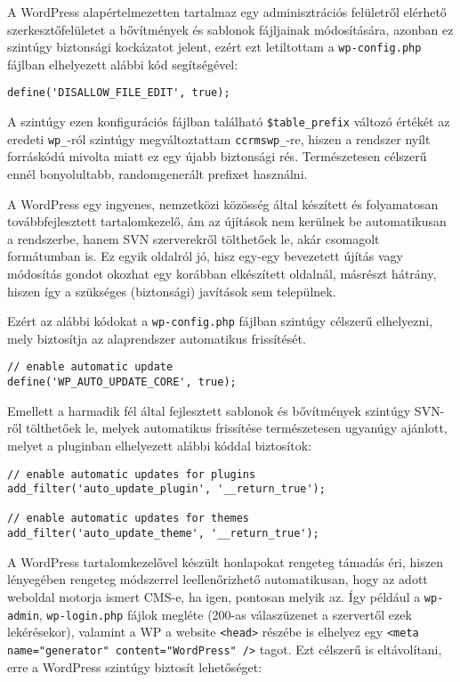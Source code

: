 A WordPress alapértelmezetten tartalmaz egy adminisztrációs felületről elérhető szerkesztőfelületet a bővítmények és sablonok fájljainak módosítására, azonban ez szintúgy biztonsági kockázatot jelent, ezért ezt letiltottam a \texttt{wp-config.php} fájlban elhelyezett alábbi kód segítségével:

\begin{lstlisting}
define('DISALLOW_FILE_EDIT', true);
\end{lstlisting}

A szintúgy ezen konfigurációs fájlban található \texttt{\$table\_prefix} változó értékét az eredeti \texttt{wp\_}-ról szintúgy megváltoztattam \texttt{ccrmswp\_}-re, hiszen a rendszer nyílt forráskódú mivolta miatt ez egy újabb biztonsági rés. Természetesen célszerű ennél bonyolultabb, randomgenerált prefixet használni.

A WordPress egy ingyenes, nemzetközi közösség által készített és folyamatosan továbbfejlesztett tartalomkezelő, ám az újítások nem kerülnek be automatikusan a rendszerbe, hanem SVN szerverekről tölthetőek le, akár csomagolt formátumban is. Ez egyik oldalról jó, hisz egy-egy bevezetett újítás vagy módosítás gondot okozhat egy korábban elkészített oldalnál, másrészt hátrány, hiszen így a szükséges (biztonsági) javítások sem települnek.

Ezért az alábbi kódokat a \texttt{wp-config.php} fájlban szintúgy célszerű elhelyezni, mely biztosítja az alaprendszer automatikus frissítését.

\begin{lstlisting}
// enable automatic update
define('WP_AUTO_UPDATE_CORE', true);
\end{lstlisting}

Emellett a harmadik fél által fejlesztett sablonok és bővítmények szintúgy SVN-ről tölthetőek le, melyek automatikus frissítése természetesen ugyanúgy ajánlott, melyet a pluginban elhelyezett alábbi kóddal biztosítok:

\begin{lstlisting}
// enable automatic updates for plugins
add_filter('auto_update_plugin', '__return_true');

// enable automatic updates for themes
add_filter('auto_update_theme', '__return_true');
\end{lstlisting}

A WordPress tartalomkezelővel készült honlapokat rengeteg támadás éri, hiszen lényegében rengeteg módszerrel leellenőrizhető automatikusan, hogy az adott weboldal motorja ismert CMS-e, ha igen, pontosan melyik az. Így például a \verb|wp-admin|, \verb|wp-login.php| fájlok megléte (200-as válaszüzenet a szervertől ezek lekérésekor), valamint a WP a website \texttt{<head>} részébe is elhelyez egy \texttt{<meta name="generator" content="WordPress" />} tagot. Ezt célszerű is eltávolítani, erre a WordPress szintúgy biztosít lehetőséget:

